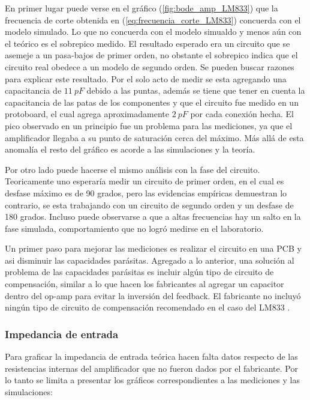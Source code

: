 

En primer lugar puede verse en el gráfico (\ref{fig:bode_amp_LM833}) que la frecuencia de corte obtenida en (\ref{eq:frecuencia_corte_LM833}) concuerda con el modelo simulado. Lo que no concuerda con el modelo simualdo y menos aún con el teórico es el sobrepico medido. El resultado esperado era un circuito que se asemeje a un pasa-bajos de primer orden, no obstante el sobrepico indica que el circuito real obedece a un modelo de segundo orden. Se pueden buscar razones para explicar este resultado. Por el solo acto de medir se esta agregando una capacitancia de $11 \ pF$ debido a las puntas, además se tiene que tener en cuenta la capacitancia de las patas de los componentes y que el circuito fue medido en un protoboard, el cual agrega aproximadamente $2 \ pF$ por cada conexión hecha. El pico observado en un principio fue un problema para las mediciones, ya que el amplificador llegaba a su punto de saturación cerca del máximo. Más allá de esta anomalía el resto del gráfico es acorde a las simulaciones y la teoría. 

Por otro lado puede hacerse el mismo análisis con la fase del circuito. Teoricamente uno esperaría medir un circuito de primer orden, en el cual es desfase máximo es de 90 grados, pero las evidencias empíricas demuestran lo contrario, se esta trabajando con un circuito de segundo orden y un desfase de 180 grados. Incluso puede observarse a que a altas frecuencias hay un salto en la fase simulada, comportamiento que no logró medirse en el laboratorio.

Un primer paso para mejorar las mediciones es realizar el circuito en una PCB y asi disminuir las capacidades parásitas. Agregado a lo anterior, una solución al problema de las capacidades parásitas es incluir algún tipo de circuito de compensación, similar a lo que hacen los fabricantes al agregar un capacitor dentro del op-amp para evitar la inversión del feedback. El fabricante no incluyó ningún tipo de circuito de compensación recomendado en el caso del LM833 .

\subsubsection{Impedancia de entrada}

Para graficar la impedancia de entrada teórica hacen falta datos respecto de las resistencias internas del amplificador que no fueron dados por el fabricante. Por lo tanto se limita a presentar los gráficos correspondientes a las mediciones y las simulaciones:

